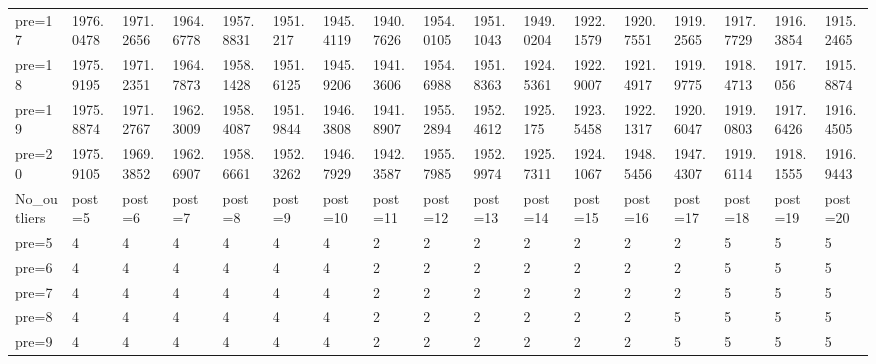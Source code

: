 \documentclass[11pt]{article}
\begin{document}
\begin{tabular}{lllllllllllllllll}
	 pre=17      & 1976.0478   & 1971.2656   & 1964.6778   & 1957.8831   & 1951.217    & 1945.4119   & 1940.7626   & 1954.0105   & 1951.1043   & 1949.0204   & 1922.1579   & 1920.7551   & 1919.2565   & 1917.7729   & 1916.3854   & 1915.2465  \\
	 pre=18      & 1975.9195   & 1971.2351   & 1964.7873   & 1958.1428   & 1951.6125   & 1945.9206   & 1941.3606   & 1954.6988   & 1951.8363   & 1924.5361   & 1922.9007   & 1921.4917   & 1919.9775   & 1918.4713   & 1917.056    & 1915.8874  \\
	 pre=19      & 1975.8874   & 1971.2767   & 1962.3009   & 1958.4087   & 1951.9844   & 1946.3808   & 1941.8907   & 1955.2894   & 1952.4612   & 1925.175    & 1923.5458   & 1922.1317   & 1920.6047   & 1919.0803   & 1917.6426   & 1916.4505  \\
	 pre=20      & 1975.9105   & 1969.3852   & 1962.6907   & 1958.6661   & 1952.3262   & 1946.7929   & 1942.3587   & 1955.7985   & 1952.9974   & 1925.7311   & 1924.1067   & 1948.5456   & 1947.4307   & 1919.6114   & 1918.1555   & 1916.9443  \\
	 No\_outliers & post=5        & post=6        & post=7        & post=8        & post=9        & post=10       & post=11       & post=12       & post=13       & post=14       & post=15       & post=16       & post=17       & post=18       & post=19       & post=20      \\
	 pre=5       & 4           & 4           & 4           & 4           & 4           & 4           & 2           & 2           & 2           & 2           & 2           & 2           & 2           & 5           & 5           & 5          \\
	 pre=6       & 4           & 4           & 4           & 4           & 4           & 4           & 2           & 2           & 2           & 2           & 2           & 2           & 2           & 5           & 5           & 5          \\
	 pre=7       & 4           & 4           & 4           & 4           & 4           & 4           & 2           & 2           & 2           & 2           & 2           & 2           & 2           & 5           & 5           & 5          \\
	 pre=8       & 4           & 4           & 4           & 4           & 4           & 4           & 2           & 2           & 2           & 2           & 2           & 2           & 5           & 5           & 5           & 5          \\
	 pre=9       & 4           & 4           & 4           & 4           & 4           & 4           & 2           & 2           & 2           & 2           & 2           & 2           & 5           & 5           & 5           & 5          \\

\end{tabular}
\end{document}
